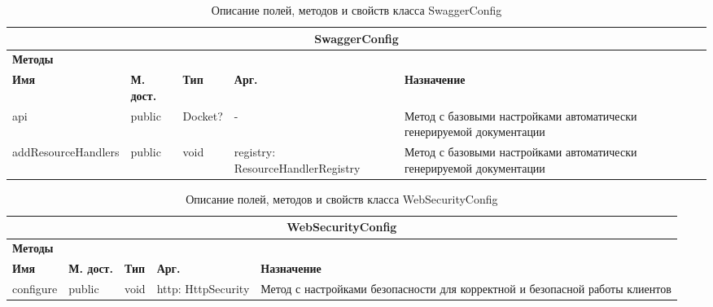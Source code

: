 \documentclass{../includes/TechDoc}
\begin{document}
    \begin{table}[h]
        \caption{\label{tab:class-SwaggerConfig-table}Описание полей, методов и свойств класса SwaggerConfig}
        \begin{tabularx}{\textwidth}{|l|l|l|l|X|}
            \hline
            \multicolumn{5}{|c|}{SwaggerConfig} \\ \hline
            \multicolumn{5}{|l|}{\textbf{Методы}} \\ \hline
            \textbf{Имя}   & \textbf{М. дост.} & \textbf{Тип} & \textbf{Арг.} & \textbf{Назначение}                      \\ \hline
            api   & public            & Docket?         & -    & Метод с базовыми настройками автоматически генерируемой документации      \\ \hline
            addResourceHandlers   & public            & void         & registry: ResourceHandlerRegistry    & Метод с базовыми настройками автоматически генерируемой документации      \\ \hline
        \end{tabularx}
    \end{table}

    \begin{table}[h]
        \caption{\label{tab:class-WebSecurityConfig-table}Описание полей, методов и свойств класса WebSecurityConfig}
        \begin{tabularx}{\textwidth}{|l|l|l|l|X|}
            \hline
            \multicolumn{5}{|c|}{WebSecurityConfig} \\ \hline
            \multicolumn{5}{|l|}{\textbf{Методы}} \\ \hline
            \textbf{Имя}   & \textbf{М. дост.} & \textbf{Тип} & \textbf{Арг.} & \textbf{Назначение}                      \\ \hline
            configure   & public            & void         & http: HttpSecurity    & Метод с настройками безопасности для корректной и безопасной работы клиентов      \\ \hline
        \end{tabularx}
    \end{table}

    \registrationList
\end{document}
